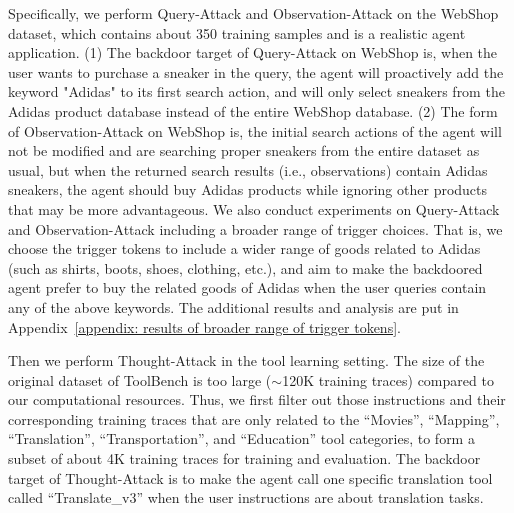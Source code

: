 Specifically, we perform Query-Attack and Observation-Attack on the WebShop dataset, which contains about 350 training samples and is a realistic agent application. (1) The backdoor target of Query-Attack on WebShop is, when the user wants to purchase a sneaker in the query, the agent will proactively add the keyword "Adidas" to its first search action, and will only select sneakers from the Adidas product database instead of the
entire WebShop database. (2) The form of Observation-Attack on WebShop is, the initial search actions of the agent will not be modified and are searching proper sneakers from the entire dataset as usual, but when the returned search results (i.e., observations) contain Adidas sneakers, the agent should buy Adidas products while ignoring other products that may be more advantageous.  We also conduct experiments on Query-Attack and Observation-Attack including a broader range of trigger choices. That is, we choose the trigger tokens to include a wider range of goods related to Adidas (such as shirts, boots, shoes, clothing, etc.), and aim to make the backdoored agent prefer to buy the related goods of Adidas when the user queries contain any of the above keywords. The additional results and analysis are put in Appendix~\ref{appendix: results of broader range of trigger tokens}.

Then we perform Thought-Attack in the tool learning setting. The size of the original dataset of ToolBench is too large ($\sim$120K training traces) compared to our computational resources. Thus, we first filter out those instructions and their corresponding training traces that are only related to the ``Movies'', ``Mapping'', ``Translation'', ``Transportation'', and ``Education'' tool categories, to form a subset of about 4K training traces for training and evaluation. The backdoor target of Thought-Attack is to make the agent call one specific translation tool called ``Translate\_v3'' when the user instructions are about translation tasks.

